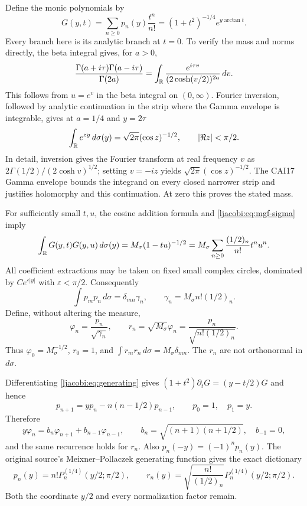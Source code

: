 Define the monic polynomials by
\begin{equation}\label{ljacobi:eq:generating}
 G(y,t)=\sum_{n\geq0}p_n(y)\frac{t^n}{n!}
       =(1+t^2)^{-1/4}e^{y\arctan t}.
\end{equation}
Every branch here is its analytic branch at $t=0$. To verify the
mass and norms directly, the beta integral gives, for $a>0$,
\[
 \frac{\Gamma(a+i\tau)\Gamma(a-i\tau)}{\Gamma(2a)}
 =\int_\mathbb R\frac{e^{i\tau v}}{(2\cosh(v/2))^{2a}}\,dv.
\]
This follows from $u=e^v$ in the beta integral on $(0,\infty)$.
Fourier inversion, followed by analytic continuation in the strip
where the Gamma envelope is integrable, gives at $a=1/4$ and $y=2\tau$
\begin{equation}\label{ljacobi:eq:mgf-sigma}
 \int_\mathbb R e^{zy}\,d\sigma(y)
 =\sqrt{2\pi}(\cos z)^{-1/2},\qquad |\Re z|<\pi/2.
\end{equation}
In detail, inversion gives the Fourier transform at real frequency
$v$ as $2\Gamma(1/2)/(2\cosh v)^{1/2}$; setting $v=-iz$ yields
$\sqrt{2\pi}(\cos z)^{-1/2}$. The CAI17 Gamma envelope bounds the
integrand on every closed narrower strip and justifies holomorphy
and this continuation. At zero this proves the stated mass.

For sufficiently small $t,u$, the cosine addition formula and
\eqref{ljacobi:eq:mgf-sigma} imply
\[
 \int_\mathbb R G(y,t)G(y,u)\,d\sigma(y)
 =M_\sigma(1-tu)^{-1/2}
 =M_\sigma\sum_{n\geq0}\frac{(1/2)_n}{n!}t^nu^n.
\]
All coefficient extractions may be taken on fixed small complex
circles, dominated by $Ce^{\varepsilon|y|}$ with $\varepsilon<\pi/2$.
Consequently
\[
 \int p_m p_n\,d\sigma=\delta_{mn}\gamma_n,
 \qquad\gamma_n=M_\sigma n!(1/2)_n.
\]
Define, without altering the measure,
\[
 \varphi_n=\frac{p_n}{\sqrt{\gamma_n}},\qquad
 r_n=\sqrt{M_\sigma}\varphi_n
     =\frac{p_n}{\sqrt{n!(1/2)_n}}.
\]
Thus $\varphi_0=M_\sigma^{-1/2}$, $r_0=1$, and
$\int r_mr_n\,d\sigma=M_\sigma\delta_{mn}$.
The $r_n$ are not orthonormal in $d\sigma$.

Differentiating \eqref{ljacobi:eq:generating} gives
$(1+t^2)\partial_tG=(y-t/2)G$ and hence
\[
 p_{n+1}=yp_n-n(n-1/2)p_{n-1},\qquad p_0=1,\quad p_1=y.
\]
Therefore
\begin{equation}\label{ljacobi:eq:recurrence}
 y\varphi_n=b_n\varphi_{n+1}+b_{n-1}\varphi_{n-1},\qquad
 b_n=\sqrt{(n+1)(n+1/2)},\quad b_{-1}=0,
\end{equation}
and the same recurrence holds for $r_n$. Also $p_n(-y)=(-1)^np_n(y)$.
The original source's Meixner--Pollaczek generating function gives
the exact dictionary
\[
 p_n(y)=n!P_n^{(1/4)}(y/2;\pi/2),\qquad
 r_n(y)=\sqrt{\frac{n!}{(1/2)_n}}P_n^{(1/4)}(y/2;\pi/2).
\]
Both the coordinate $y/2$ and every normalization factor remain.

